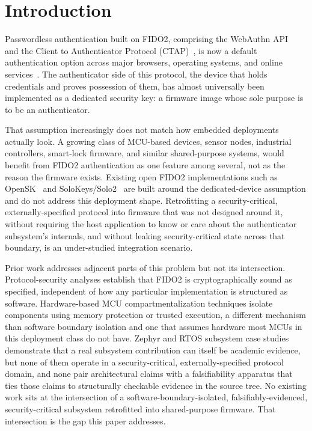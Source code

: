 \section{Introduction}
\label{sec:introduction}

Passwordless authentication built on FIDO2, comprising the WebAuthn API~\cite{webauthn-l3} and the Client to Authenticator Protocol (CTAP)~\cite{ctap21}, is now a default authentication option across major browsers, operating systems, and online services~\cite{fido2-overview}. The authenticator side of this protocol, the device that holds credentials and proves possession of them, has almost universally been implemented as a dedicated security key: a firmware image whose sole purpose is to be an authenticator.

That assumption increasingly does not match how embedded deployments actually look. A growing class of MCU-based devices, sensor nodes, industrial controllers, smart-lock firmware, and similar shared-purpose systems, would benefit from FIDO2 authentication as one feature among several, not as the reason the firmware exists. Existing open FIDO2 implementations such as OpenSK~\cite{opensk} and SoloKeys/Solo2~\cite{solokeys} are built around the dedicated-device assumption and do not address this deployment shape. Retrofitting a security-critical, externally-specified protocol into firmware that was not designed around it, without requiring the host application to know or care about the authenticator subsystem's internals, and without leaking security-critical state across that boundary, is an under-studied integration scenario.

Prior work addresses adjacent parts of this problem but not its intersection. Protocol-security analyses establish that FIDO2 is cryptographically sound as specified, independent of how any particular implementation is structured as software. Hardware-based MCU compartmentalization techniques isolate components using memory protection or trusted execution, a different mechanism than software boundary isolation and one that assumes hardware most MCUs in this deployment class do not have. Zephyr and RTOS subsystem case studies demonstrate that a real subsystem contribution can itself be academic evidence, but none of them operate in a security-critical, externally-specified protocol domain, and none pair architectural claims with a falsifiability apparatus that ties those claims to structurally checkable evidence in the source tree. No existing work sits at the intersection of a software-boundary-isolated, falsifiably-evidenced, security-critical subsystem retrofitted into shared-purpose firmware. That intersection is the gap this paper addresses.

